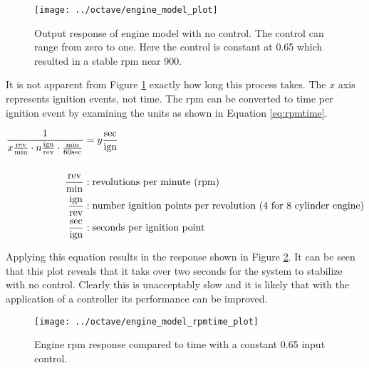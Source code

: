\documentclass{article}
\begin{document}
\begin{figure}[htbp!]
\begin{center}
\texttt{[image: ../octave/engine\_model\_plot]}
\end{center}
\caption{Output response of engine model with no control.
The control can range from zero to one.
Here the control is constant at 0.65 which resulted in a stable
rpm near 900.\protect\footnotemark}
\label{fig:em_plot}
\end{figure}


It is not apparent from Figure \ref{fig:em_plot} exactly how long
this process takes.
The $x$ axis represents ignition events, not time.
The rpm can be converted to time per ignition event by examining
the units as shown in Equation \ref{eq:rpmtime}.

\begin{align}
\frac{1}{x \frac{\text{rev}}{\text{min}}
			\cdot n \frac{\text{ign}}{\text{rev}}
			\cdot \frac{\text{min}}{60\text{sec}}
		}
&= y \frac{\text{sec}}{\text{ign}} \label{eq:rpmtime} \\
& \notag \\
	\frac{\text{rev}}{\text{min}} &: \text{revolutions per minute (rpm)} \notag \\
	\frac{\text{ign}}{\text{rev}} &: \text{number ignition points per revolution (4 for 8 cylinder engine)} \notag \\
	\frac{\text{sec}}{\text{ign}} &: \text{seconds per ignition point} \notag
\end{align}

Applying this equation results in the response shown
in Figure \ref{fig:rpmtime_plot}.
It can be seen that this plot reveals that it taks over two seconds
for the system to stabilize with no control.
Clearly this is unacceptably slow and it is likely that with
the application of a controller its performance can be improved.

\begin{figure}[htbp!]
\begin{center}
\texttt{[image: ../octave/engine\_model\_rpmtime\_plot]}
\end{center}
\caption{Engine rpm response compared to time with a constant
0.65 input control.\protect\footnotemark}
\label{fig:rpmtime_plot}
\end{figure}
\end{document}
